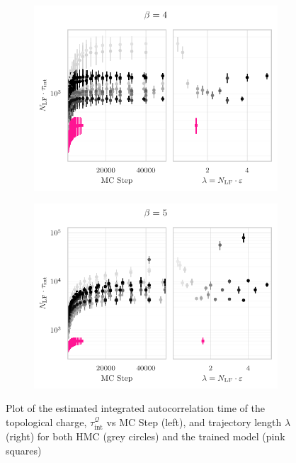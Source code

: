 \documentclass{article} %
\begin{document}
%
\begin{figure}[htpb]
   \centering
   \begin{subfigure}{0.4\textwidth}
      \includegraphics[width=\textwidth]{figures/autocorr_plots_2021_03_09/autocorr_vs_traj_len_2152_b4.pdf}
   \end{subfigure}
   \begin{subfigure}{0.4\textwidth}
      \includegraphics[width=\textwidth]{figures/autocorr_plots_2021_03_09/autocorr_vs_traj_len_2152_b5.pdf}
   \end{subfigure}
   \caption{\label{fig:autocorrbeta45}Plot of the estimated integrated autocorrelation time of the topological charge,
      \(\tau_{\mathrm{int}}^{\mathcal{Q}}\) vs MC Step (left), and trajectory length \(\lambda\) (right) for both HMC
   (grey circles) and the trained model (pink squares)}
\end{figure}
\end{document}
